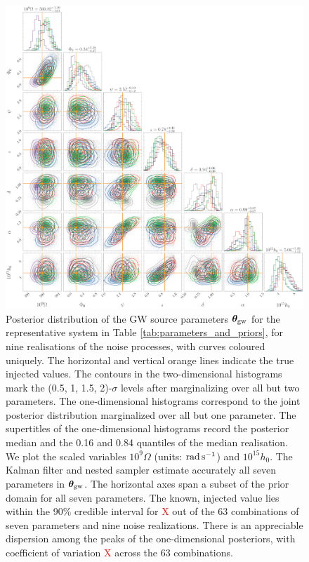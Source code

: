 \documentclass[fleqn,usenatbib,useAMS]{mnras}
\begin{document}
 
\begin{figure}
	\includegraphics[width=\textwidth, height =\textwidth ]{images/stacked_GW_plot_small_h_definitive2}
	\caption{Posterior distribution of the GW source parameters $\boldsymbol{\theta}_{\rm gw}$ for the representative system in Table \ref{tab:parameters_and_priors}, for nine realisations of the noise processes, with curves coloured uniquely. The horizontal and vertical orange lines indicate the true injected values. The contours in the two-dimensional histograms mark the (0.5, 1, 1.5, 2)-$\sigma$ levels after marginalizing over all but two parameters. The one-dimensional histograms correspond to the joint posterior distribution marginalized over all but one parameter. The supertitles of the one-dimensional histograms record the posterior median and the 0.16 and 0.84 quantiles of the median realisation. We plot the scaled variables $10^9 \Omega$ (units: ${\rm rad \, s^{-1}}$) and $10^{15} h_0$. The Kalman filter and nested sampler estimate accurately all seven parameters in ${\boldsymbol{\theta}}_{\rm gw}$. The horizontal axes span a subset of the prior domain for all seven parameters. The known, injected value lies within the 90\% credible interval for \textcolor{red}{X} out of the 63 combinations of seven parameters and nine noise realizations. There is an appreciable dispersion among the peaks of the one-dimensional posteriors, with coefficient of variation \textcolor{red}{X} across the 63 combinations.}
	\label{fig:corner_plot_1}
\end{figure}
\end{document}
